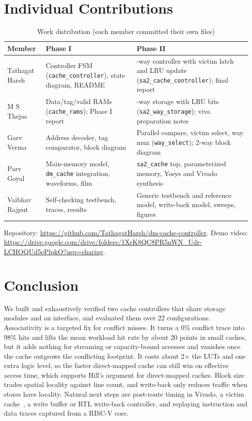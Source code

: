 \documentclass[conference]{IEEEtran}
\newcommand{\MemA}{Tathagat Harsh}  \newcommand{\RollA}{2401010477}
\newcommand{\MemB}{M S Thejas}      \newcommand{\RollB}{2401010255}
\newcommand{\MemC}{Garv Verma}      \newcommand{\RollC}{2401010168}
\newcommand{\MemD}{Parv Goyal}      \newcommand{\RollD}{2401010322}
\newcommand{\MemE}{Vaibhav Rajput}  \newcommand{\RollE}{2401010487}
\newcommand{\RepoURL}{https://github.com/TathagatHarsh/dm-cache-controller}
\newcommand{\VideoURL}{https://drive.google.com/drive/folders/1XrK8QC8PR5nWN_Udr-LCHOQUd5ePlpkO?usp=sharing}
\begin{document}
\section{Individual Contributions}
\begin{table}[h]\centering
\caption{Work distribution (each member committed their own files)}\label{tab:contrib}
\begin{tabular}{@{}>{\raggedright\arraybackslash}p{}>{\raggedright\arraybackslash}p{}>{\raggedright\arraybackslash}p{}@{}}\toprule
Member & Phase I & Phase II \\ \midrule
\MemA & Controller FSM (\texttt{cache\_controller}), state diagram, README & 2-way controller with victim latch and LRU update (\texttt{sa2\_cache\_controller}); final report \\
\MemB & Data/tag/valid RAMs (\texttt{cache\_rams}); Phase I report & 2-way storage with LRU bits (\texttt{sa2\_way\_storage}); viva preparation notes \\
\MemC & Address decoder, tag comparator, block diagram & Parallel compare, victim select, way mux (\texttt{way\_select}); 2-way block diagram \\
\MemD & Main-memory model, \texttt{dm\_cache} integration, waveforms, film & \texttt{sa2\_cache} top, parameterized memory, Yosys and Vivado synthesis \\
\MemE & Self-checking testbench, traces, results & Generic testbench and reference model, write-back model, sweeps, figures \\ \bottomrule
\end{tabular}\end{table}
Repository: \url{\RepoURL}. Demo video: \url{\VideoURL}.

\section{Conclusion}
We built and exhaustively verified two cache controllers that share storage modules and an interface, and evaluated them over 22 configurations. Associativity is a targeted fix for conflict misses. It turns a 0\% conflict trace into 98\% hits and lifts the mean workload hit rate by about 20 points in small caches, but it adds nothing for streaming or capacity-bound accesses and vanishes once the cache outgrows the conflicting footprint. It costs about 2$\times$ the LUTs and one extra logic level, so the faster direct-mapped cache can still win on effective access time, which supports Hill's argument for direct-mapped caches. Block size trades spatial locality against line count, and write-back only reduces traffic when stores have locality. Natural next steps are post-route timing in Vivado, a victim cache~\cite{jouppi1990}, a write buffer or RTL write-back controller, and replaying instruction and data traces captured from a RISC-V core.
\end{document}
